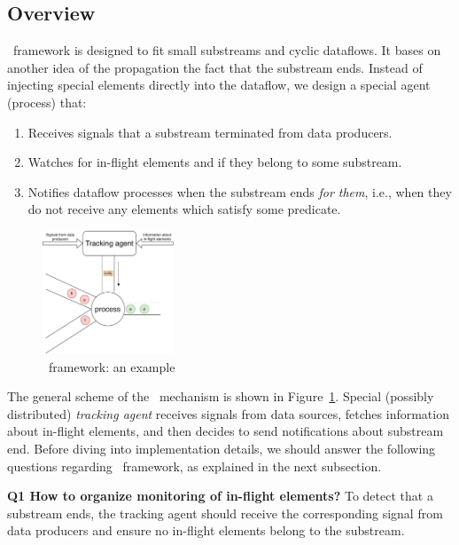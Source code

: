 \label{fs-acker-preliminaries}

\subsection{Overview}

\tracker\ framework is designed to fit small substreams and cyclic dataflows. It bases on another idea of the propagation the fact that the substream ends. Instead of injecting special elements directly into the dataflow, we design a special agent (process) that:

\begin{enumerate}
    \item Receives signals that a substream terminated from data producers.
    \item Watches for in-flight elements and if they belong to some substream.
    \item Notifies dataflow processes when the substream ends {\em for them}, i.e., when they do not receive any elements which satisfy some predicate.
\end{enumerate}

\begin{figure}[htbp]
  \centering
  \includegraphics[width=0.35\textwidth]{pics/tracker-scheme.pdf}
  \caption{\tracker\ framework: an example}
  \label{tracker_scheme}
\end{figure}

The general scheme of the \tracker\ mechanism is shown in Figure~\ref{tracker_scheme}. Special (possibly distributed) {\em tracking agent} receives signals from data sources, fetches information about in-flight elements, and then decides to send notifications about substream end. Before diving into implementation details, we should answer the following questions regarding \tracker\ framework, as explained in the next subsection.

{\bf Q1 How to organize monitoring of in-flight elements?} To detect that a substream ends, the tracking agent should receive the corresponding signal from data producers and ensure no in-flight elements belong to the substream. 

